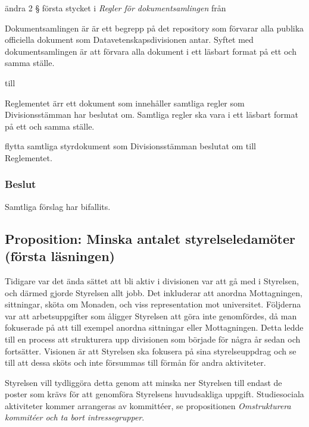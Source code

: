 \documentclass[protokoll]{dvd}
\begin{document}
\begin{attsatser}
	\item ändra 2 § första stycket i \emph{Regler för dokumentsamlingen} från

	\begin{displayquote}
		Dokumentsamlingen är är ett begrepp på det repository som förvarar alla publika officiella dokument som Datavetenskapsdivisionen antar.
		Syftet med dokumentsamlingen är att förvara alla dokument i ett läsbart format på ett och samma ställe.
	\end{displayquote}

	till

	\begin{displayquote}
		Reglementet ärr ett dokument som innehåller samtliga regler som Divisionsstämman har beslutat om.
		Samtliga regler ska vara i ett läsbart format på ett och samma ställe.
	\end{displayquote}

	\item flytta samtliga styrdokument som Divisionsstämman beslutat om till Reglementet.
\end{attsatser}

\subsubsection{Beslut}
\begin{attsatser}
	\item Samtliga förslag har bifallits.
\end{attsatser}


\newpage
\subsection{Proposition: Minska antalet styrelseledamöter (första läsningen)}

Tidigare var det ända sättet att bli aktiv i divisionen var att gå med i Styrelsen, och därmed gjorde Styrelsen allt jobb.
Det inkluderar att anordna Mottagningen, sittningar, sköta om Monaden, och viss representation mot universitet.
Följderna var att arbetsuppgifter som åligger Styrelsen att göra inte genomfördes, då man fokuserade på att till exempel anordna sittningar eller Mottagningen.
Detta ledde till en process att strukturera upp divisionen som började för några år sedan och fortsätter.
Visionen är att Styrelsen ska fokusera på sina styrelseuppdrag och se till att dessa sköts och inte försummas till förmån för andra aktiviteter.

Styrelsen vill tydliggöra detta genom att minska ner Styrelsen till endast de poster som krävs för att genomföra Styrelsens huvudsakliga uppgift.
Studiesociala aktiviteter kommer arrangeras av kommittéer, se propositionen \textit{Omstrukturera kommitéer och ta bort intressegrupper}.
\end{document}
